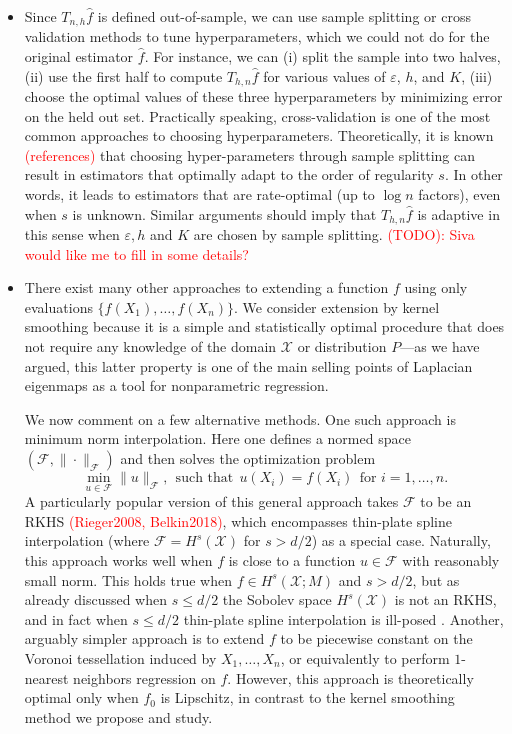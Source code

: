\documentclass{article}
\newcommand{\1}{\mathbf{1}}
\newcommand{\mc}[1]{\mathcal{#1}}
\newcommand{\wh}[1]{\widehat{#1}}
\theoremstyle{alden}
\theoremstyle{aldenthm}
\theoremstyle{definition}
\theoremstyle{remark}
\begin{document}
\begin{itemize}
	\item Since $T_{n,h}\wh{f}$ is defined out-of-sample, we can use sample splitting or cross validation methods to tune hyperparameters, which we could not do for the original estimator $\wh{f}$. For instance, we can (i) split the sample into two halves, (ii) use the first half to compute $T_{h,n}\wh{f}$ for various values of $\varepsilon$, $h$, and $K$, (iii) choose the optimal values of these three hyperparameters by minimizing error on the held out set. Practically speaking, cross-validation is one of the most common approaches to choosing hyperparameters. Theoretically, it is known \textcolor{red}{(references)} that choosing hyper-parameters through sample splitting can result in estimators that optimally adapt to the order of regularity $s$. In other words, it leads to estimators that are rate-optimal (up to $\log n$ factors), even when $s$ is unknown. Similar arguments should imply that $T_{h,n}\wh{f}$ is adaptive in this sense when $\varepsilon,h$ and $K$ are chosen by sample splitting. \textcolor{red}{(TODO): Siva would like me to fill in some details?}
	\item There exist many other approaches to extending a function $f$ using only evaluations $\{f(X_1),\ldots,f(X_n)\}$. We consider extension by kernel smoothing because it is a simple and statistically optimal procedure that does not require any knowledge of the domain $\mc{X}$ or distribution $P$---as we have argued, this latter property is one of the main selling points of Laplacian eigenmaps as a tool for nonparametric regression. 
	
	We now comment on a few alternative methods. One such approach is minimum norm interpolation. Here one defines a normed space $(\mc{F},\|\cdot\|_{\mc{F}})$ and then solves the optimization problem
	\begin{equation*}
	\min_{u \in \mc{F}} \|u\|_{\mc{F}},~~\textrm{such that}~~ u(X_i) =  f(X_i)~~\textrm{for $i = 1,\ldots,n$.}
	\end{equation*}
	A particularly popular version of this general approach takes $\mc{F}$ to be an RKHS \textcolor{red}{(Rieger2008, Belkin2018)}, which encompasses thin-plate spline interpolation (where $\mc{F} = H^s(\mc{X})$ for $s > d/2$) as a special case. Naturally, this approach works well when $f$ is close to a function $u \in \mc{F}$ with reasonably small norm.  This holds true when $f \in H^s(\mc{X};M)$ and $s > d/2$, but as already discussed when $s \leq d/2$ the Sobolev space $H^s(\mc{X})$ is not an RKHS, and in fact when $s \leq d/2$ thin-plate spline interpolation is ill-posed \citep{green93}. Another, arguably simpler approach is to extend $f$ to be piecewise constant on the Voronoi tessellation induced by $X_1,\ldots,X_n$, or equivalently to perform $1$-nearest neighbors regression on $f$. However, this approach is theoretically optimal only when $f_0$ is Lipschitz, in contrast to the kernel smoothing method we propose and study.
	

\end{itemize}
\end{document}

